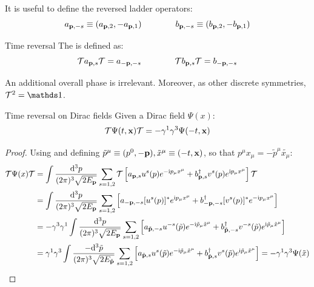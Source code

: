 It is useful to define the reversed ladder operators:
\begin{equation}
  a_{\mathbf{p},-s} \equiv (a_{\mathbf{p},2} , -a_{\mathbf{p},1})
  \qquad \qquad
  b_{\mathbf{p},-s} \equiv (b_{\mathbf{p},2} , -b_{\mathbf{p},1})
\end{equation}

\begin{definition}{Time reversal}{}
  The  is defined as:
  \begin{equation}
    \mathcal{T} a_{\mathbf{p},s} \mathcal{T} = a_{-\mathbf{p},-s}
    \qquad \qquad
    \mathcal{T} b_{\mathbf{p},s} \mathcal{T} = b_{-\mathbf{p},-s}
  \end{equation}
\end{definition}

An additional overall phase is irrelevant. Moreover, as other discrete symmetries, $ \timer^2 = \id $.

\begin{proposition}{Time reversal on Dirac fields}{}
  Given a Dirac field $ \Psi(x) $:
  \begin{equation}
    \mathcal{T} \Psi(t,\mathbf{x}) \mathcal{T} = - \gamma^1 \gamma^3 \Psi(-t,\mathbf{x})
  \end{equation}
\end{proposition}

\begin{proofbox}
 \begin{proof}
   Using  and defining $ \tilde{p}^\mu \equiv (p^0,-\mathbf{p}) , \tilde{x}^\mu \equiv (-t,\mathbf{x}) $, so that $ p^\mu x_\mu = -\tilde{p}^\mu \tilde{x_\mu} $:
   \begin{equation*}
       \begin{split}
         \mathcal{T} \Psi(x) \mathcal{T}
         &= \int \frac{\mathrm{d}^3p}{(2\pi)^3 \sqrt{2E_{\mathbf{p}}}} \sum_{s = 1,2} \mathcal{T} \left[ a_{\mathbf{p},s} u^s(p) e^{-\mathrm{i} p_\mu x^\mu} + b_{\mathbf{p},s}^\dagger v^s(p) e^{\mathrm{i} p_\mu x^\mu} \right] \mathcal{T} \\
         &= \int \frac{\mathrm{d}^3p}{(2\pi)^3 \sqrt{2E_{\mathbf{p}}}} \sum_{s = 1,2} \left[ a_{-\mathbf{p},-s} [u^s(p)]^* e^{\mathrm{i} p_\mu x^\mu} + b_{-\mathbf{p},-s}^\dagger [v^s(p)]^* e^{-\mathrm{i} p_\mu x^\mu} \right] \\
         &= - \gamma^3 \gamma^1 \int \frac{\mathrm{d}^3p}{(2\pi)^3 \sqrt{2E_{\mathbf{p}}}} \sum_{s = 1,2} \left[ a_{\tilde{\mathbf{p}},-s} u^{-s}(\tilde{p}) e^{-\mathrm{i} \tilde{p}_\mu \tilde{x}^\mu} + b_{\tilde{\mathbf{p}},-s}^\dagger v^{-s}(\tilde{p}) e^{\mathrm{i} \tilde{p}_\mu \tilde{x}^\mu} \right] \\
         &= \gamma^1 \gamma^3 \int \frac{-\mathrm{d}^3\tilde{p}}{(2\pi)^3 \sqrt{2E_{\tilde{\mathbf{p}}}}} \sum_{s = 1,2} \left[ a_{\tilde{\mathbf{p}},s} u^s(\tilde{p}) e^{-\mathrm{i} \tilde{p}_\mu \tilde{x}^\mu} + b_{\tilde{\mathbf{p}},s}^\dagger v^s(\tilde{p}) e^{\mathrm{i} \tilde{p}_\mu \tilde{x}^\mu} \right]
        = - \gamma^1 \gamma^3 \Psi(\tilde{x})
      \end{split}
    \end{equation*}
  \end{proof}
\end{proofbox}

